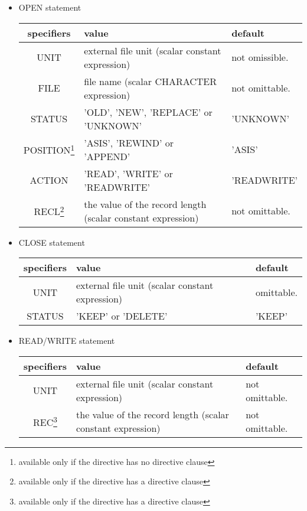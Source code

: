    \begin{itemize}
    \item OPEN statement
   
   \begin{table}[h]
    \begin{center}
     \label{tb:globalopen}
     \begin{tabular}{c|p{70mm}l}
      specifiers & value & default \\ \hline
      UNIT & external file unit (scalar constant expression)
	  & not omissible. \\
      FILE & file name (scalar CHARACTER expression)
	  & not omittable. \\
      STATUS & 'OLD', 'NEW', 'REPLACE' or 'UNKNOWN' & 'UNKNOWN' \\
      POSITION\footnote{available only if the directive has no directive
      clause} & 'ASIS', 'REWIND' or 'APPEND' & 'ASIS' \\
      ACTION & 'READ', 'WRITE' or 'READWRITE' & 'READWRITE' \\
      RECL\footnote{available only if the directive has a directive clause} & the value of the record length (scalar constant expression)
	  & not omittable. \\
     \end{tabular}
    \end{center}
   \end{table}

    \item CLOSE statement
	  
   \begin{table}[h]
    \begin{center}
     \label{tb:globalopen}
     \begin{tabular}{c|p{70mm}l}
      specifiers & value & default \\ \hline
      UNIT & external file unit (scalar constant expression)
	  & omittable. \\
      STATUS & 'KEEP' or 'DELETE'
	  & 'KEEP' \\
     \end{tabular}
    \end{center}
   \end{table}

    \item READ/WRITE statement
	  
   \begin{table}[h]
    \begin{center}
     \label{tb:globalopen}
     \begin{tabular}{c|p{70mm}l}
      specifiers & value & default \\ \hline
      UNIT & external file unit (scalar constant expression)
	  & not omittable. \\
      REC\footnote{available only if the directive has a directive clause} & the value of the record length (scalar constant expression)
	  & not omittable. \\
     \end{tabular}
    \end{center}
   \end{table}


\end{itemize}
